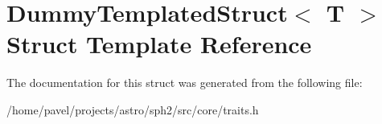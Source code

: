 \hypertarget{structDummyTemplatedStruct}{}\section{Dummy\+Templated\+Struct$<$ T $>$ Struct Template Reference}
\label{structDummyTemplatedStruct}


The documentation for this struct was generated from the following file\+:\begin{DoxyCompactItemize}
\item 
/home/pavel/projects/astro/sph2/src/core/traits.\+h\end{DoxyCompactItemize}
